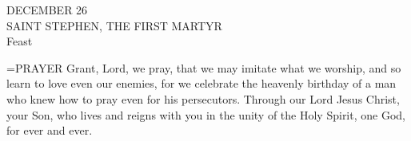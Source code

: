 \begin{center}\normalsize DECEMBER 26\\
\footnotesize SAINT STEPHEN, THE FIRST MARTYR\\
\footnotesize Feast\\
\end{center}

\hangindent=\parindent \small{PRAYER 
Grant, Lord, we pray,
that we may imitate what we worship,
and so learn to love even our enemies,
for we celebrate the heavenly birthday
of a man who knew how to pray even for his persecutors.
Through our Lord Jesus Christ, your Son,
who lives and reigns with you in the unity of the Holy Spirit,
one God, for ever and ever.\\}
 

